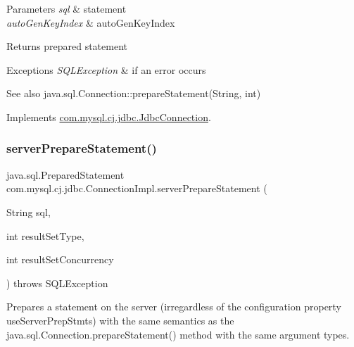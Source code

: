 \begin{DoxyParams}{Parameters}
{\em sql} & statement \\
\hline
{\em auto\+Gen\+Key\+Index} & auto\+Gen\+Key\+Index \\
\hline
\end{DoxyParams}
\begin{DoxyReturn}{Returns}
prepared statement 
\end{DoxyReturn}

\begin{DoxyExceptions}{Exceptions}
{\em S\+Q\+L\+Exception} & if an error occurs \\
\hline
\end{DoxyExceptions}
\begin{DoxySeeAlso}{See also}
java.\+sql.\+Connection\+::prepare\+Statement(\+String, int) 
\end{DoxySeeAlso}


Implements \mbox{\hyperlink{interfacecom_1_1mysql_1_1cj_1_1jdbc_1_1_jdbc_connection_a9deb2cebf6538a53be5f24c52ee39f22}{com.\+mysql.\+cj.\+jdbc.\+Jdbc\+Connection}}.

\mbox{\label{classcom_1_1mysql_1_1cj_1_1jdbc_1_1_connection_impl_a4d739eb2f2ef627fd61b4da1a57c94b5}} 
\subsubsection{\texorpdfstring{server\+Prepare\+Statement()}{serverPrepareStatement()}\hspace{0.1cm}{\footnotesize\ttfamily [3/6]}}
{\footnotesize\ttfamily java.\+sql.\+Prepared\+Statement com.\+mysql.\+cj.\+jdbc.\+Connection\+Impl.\+server\+Prepare\+Statement (\begin{DoxyParamCaption}\item[{String}]{sql,  }\item[{int}]{result\+Set\+Type,  }\item[{int}]{result\+Set\+Concurrency }\end{DoxyParamCaption}) throws S\+Q\+L\+Exception}

Prepares a statement on the server (irregardless of the configuration property \textquotesingle{}use\+Server\+Prep\+Stmts\textquotesingle{}) with the same semantics as the java.\+sql.\+Connection.\+prepare\+Statement() method with the same argument types.


